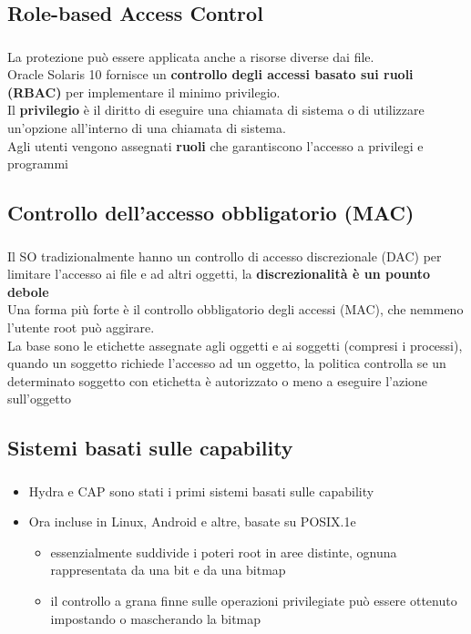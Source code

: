 \documentclass{beamer}
\newenvironment{mainframe}{
	\begin{frame}
		\frametitle{\insertsubsection}
		\framesubtitle{\insertsection}
	}{
	\end{frame}
}
\begin{document}
\subsection{Role-based Access Control}
\begin{mainframe}
	La protezione può essere applicata anche a risorse diverse dai file.\\
	Oracle Solaris 10 fornisce un \textbf{controllo degli accessi basato sui ruoli (RBAC)} per implementare il minimo privilegio.\\
	Il \textbf{privilegio} è il diritto di eseguire una chiamata di sistema o di utilizzare un'opzione all'interno di una chiamata di sistema.\\
	Agli utenti vengono assegnati \textbf{ruoli} che garantiscono l'accesso a privilegi e programmi
\end{mainframe}
\subsection{Controllo dell'accesso obbligatorio (MAC)}
\begin{mainframe}
	Il SO tradizionalmente hanno un controllo di accesso discrezionale (DAC) per limitare l'accesso ai file e ad altri oggetti, la \textbf{discrezionalità è un pounto debole}\\
	Una forma più forte è il controllo obbligatorio degli accessi (MAC), che nemmeno l'utente root può aggirare.\\
	La base sono le etichette assegnate agli oggetti e ai soggetti (compresi i processi), quando un soggetto richiede l'accesso ad un oggetto, la politica controlla se un determinato soggetto con etichetta è autorizzato o meno a eseguire l'azione sull'oggetto
\end{mainframe}
\subsection{Sistemi basati sulle capability}
\begin{mainframe}
	\begin{itemize}
		\item Hydra e CAP sono stati i primi sistemi basati sulle capability
		\item Ora incluse in Linux, Android e altre, basate su POSIX.1e
		\begin{itemize}
			\item essenzialmente suddivide i poteri root in aree distinte, ognuna rappresentata da una bit e da una bitmap
			\item il controllo a grana finne sulle operazioni privilegiate può essere ottenuto impostando o mascherando la bitmap
		\end{itemize}
	\end{itemize}
\end{mainframe}
\end{document}
